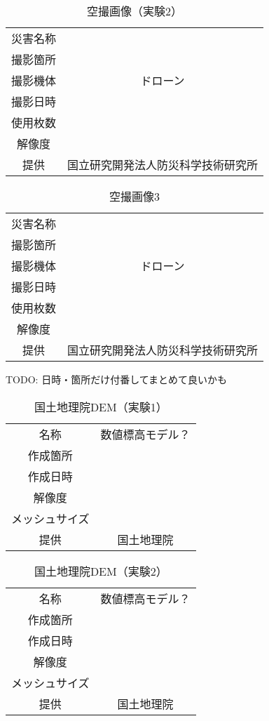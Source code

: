     \begin{table}[b]
      \centering
      \caption{空撮画像（実験2）}
      \label{空撮画像2}
      \begin{tabular}{cc}
        \hline
        災害名称 &  \\
        撮影箇所 &  \\
        撮影機体 & ドローン \\
        撮影日時 &  \\
        使用枚数 & \\
        解像度 &  \\
        提供 & 国立研究開発法人防災科学技術研究所 \\ \hline
      \end{tabular}
    \end{table}

    \begin{table}[b]
      \centering
      \caption{空撮画像3}
      \label{空撮画像3}
      \begin{tabular}{cc}
        \hline
        災害名称 &  \\
        撮影箇所 &  \\
        撮影機体 & ドローン \\
        撮影日時 &  \\
        使用枚数 & \\
        解像度 &  \\
        提供 & 国立研究開発法人防災科学技術研究所 \\ \hline
      \end{tabular}
    \end{table}

    TODO: 日時・箇所だけ付番してまとめて良いかも
    \begin{table}[b]
      \centering
      \caption{国土地理院DEM（実験1）}
      \label{国土地理院DEM1}
      \begin{tabular}{cc}
        \hline
        名称 & 数値標高モデル？ \\
        作成箇所 &  \\
        作成日時 &  \\
        解像度 & \\
        メッシュサイズ &  \\
        提供 & 国土地理院 \\ \hline
      \end{tabular}
    \end{table}

    \begin{table}[b]
      \centering
      \caption{国土地理院DEM（実験2）}
      \label{国土地理院DEM2}
      \begin{tabular}{cc}
        \hline
        名称 & 数値標高モデル？ \\
        作成箇所 &  \\
        作成日時 &  \\
        解像度 & \\
        メッシュサイズ &  \\
        提供 & 国土地理院 \\ \hline
      \end{tabular}
    \end{table}

